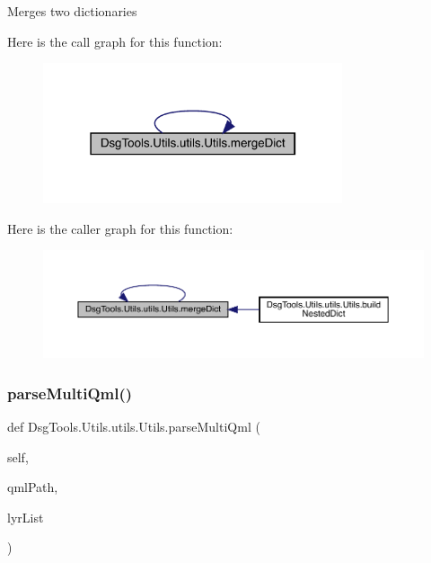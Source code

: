 \begin{DoxyVerb}Merges two dictionaries
\end{DoxyVerb}
 Here is the call graph for this function\+:
\nopagebreak
\begin{figure}[H]
\begin{center}
\leavevmode
\includegraphics[width=250pt]{class_dsg_tools_1_1_utils_1_1utils_1_1_utils_ab57951edce702c5640e2ded9c4671c1e_cgraph}
\end{center}
\end{figure}
Here is the caller graph for this function\+:
\nopagebreak
\begin{figure}[H]
\begin{center}
\leavevmode
\includegraphics[width=350pt]{class_dsg_tools_1_1_utils_1_1utils_1_1_utils_ab57951edce702c5640e2ded9c4671c1e_icgraph}
\end{center}
\end{figure}
\mbox{\label{class_dsg_tools_1_1_utils_1_1utils_1_1_utils_a340feb10d8eb550fbc1ebd5d62f2e022}} 
\subsubsection{\texorpdfstring{parse\+Multi\+Qml()}{parseMultiQml()}}
{\footnotesize\ttfamily def Dsg\+Tools.\+Utils.\+utils.\+Utils.\+parse\+Multi\+Qml (\begin{DoxyParamCaption}\item[{}]{self,  }\item[{}]{qml\+Path,  }\item[{}]{lyr\+List }\end{DoxyParamCaption})}

